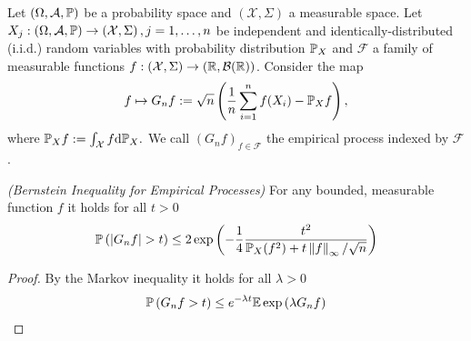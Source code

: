 
Let 
$
  \left( 
    \Omega,
    \mathcal{A},
    \P
  \right)
$
be a probability space
and
$
  \left( 
    \mathcal{X},
    \Sigma
  \right)
$
a measurable space.
Let 
$
  X_j
  :
  \left( 
    \Omega,
    \mathcal{A},
    \P
  \right)
  \to
  \left( 
    \mathcal{X},
    \Sigma
  \right)
  ,
  j=1,\ldots, n
$ be independent and identically-distributed (i.i.d.)
random variables
with probability distribution $\P_X$ 
and
$\mathcal{F}$ a family of measurable functions
$
  f:
  \left( 
    \mathcal{X},
    \Sigma
  \right)
    \to
  \left( 
    \R,
    \mathcal{B}(\R)
  \right)
$.
Consider the map
\begin{gather}
  f
  \mapsto
  G_n f
  :=
  \sqrt{n}
  \left( 
    \frac{1}{n}
    \sum_{i = 1}^{n}
      f(X_i)
    -
    \P_X f
  \right),
\end{gather}
where
$
  \P_X f 
  :=
  \int_\mathcal{X} f \text{d}\P_X.
$
We call 
$
  \left( 
    G_n f
  \right)_{f \in \mathcal{F}}
$
the empirical process indexed by $\mathcal{F}$.

\begin{lemma}
  \emph{(Bernstein Inequality for Empirical Processes)}
  For any bounded, measurable function $f$
  it holds for all $t > 0$
  \begin{gather}
    \P 
    \left(
      \left| 
        G_n f
      \right|
      >
      t
    \right)
    \le
    2
    \exp
    \left( 
      - \frac{1}{4}
      \frac{t^2}
      {
        \P_X(f^2)
        +
        t
        \norm{f}_\infty
        /
        \sqrt{n}
      }
    \right)
  \end{gather}
\end{lemma}
\begin{proof}
  By the Markov inequality it holds for all $\lambda > 0$
  \begin{gather}
    \P
    \left( 
      G_n f 
      > 
      t
    \right)
    \le
    e^{-\lambda t}
    \E
    \exp
    \left( 
      \lambda
      G_n f 
    \right)
  \end{gather}
\end{proof}
